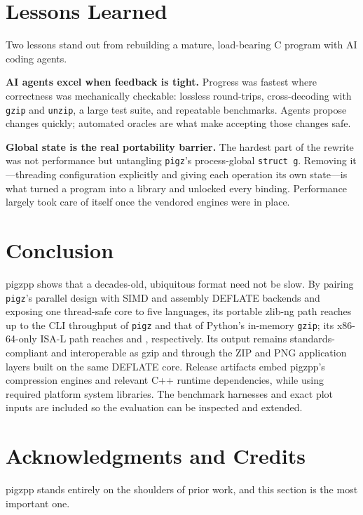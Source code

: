 \documentclass{pigzpp-whitepaper}
\begin{document}
\section{Lessons Learned}
Two lessons stand out from rebuilding a mature, load-bearing C program with AI
coding agents.

\textbf{AI agents excel when feedback is tight.} Progress was fastest where
correctness was mechanically checkable: lossless round-trips, cross-decoding with
\texttt{gzip} and \texttt{unzip}, a large test suite, and repeatable benchmarks.
Agents propose changes quickly; automated oracles are what make accepting those
changes safe.

\textbf{Global state is the real portability barrier.} The hardest part of the
rewrite was not performance but untangling \texttt{pigz}'s process-global
\texttt{struct g}. Removing it---threading configuration explicitly and giving
each operation its own state---is what turned a program into a library and
unlocked every binding. Performance largely took care of itself once the
vendored engines were in place.

\section{Conclusion}
pigzpp shows that a decades-old, ubiquitous format need not be slow. By pairing
\texttt{pigz}'s parallel design with SIMD and assembly DEFLATE backends and
exposing one thread-safe core to five languages, its portable zlib-ng path reaches
up to \best{\CliZlibVsPigz\by} the CLI throughput of \texttt{pigz} and
\best{\PythonZlibVsGzip\by} that of Python's in-memory \texttt{gzip}; its
x86-64-only ISA-L path reaches \best{\CliIsalVsPigz\by} and
\best{\PythonIsalVsGzip\by}, respectively. Its output remains
standards-compliant and interoperable as gzip and through the ZIP and PNG
application layers built on the same DEFLATE core. Release artifacts
embed pigzpp's compression engines and relevant C++ runtime dependencies, while
using required platform system libraries. The benchmark harnesses and exact plot
inputs are included so the evaluation can be inspected and extended.

\section{Acknowledgments and Credits}
pigzpp stands entirely on the shoulders of prior work, and this section is the
most important one.
\end{document}
